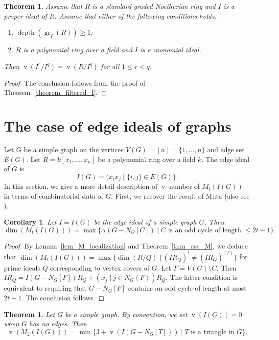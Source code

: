 \documentclass[12pt]{amsart}
\def\v{\operatorname{v}}
\def\max{\operatorname{max}}
\newtheorem{corollary}[lemma]{Corollary}
\newtheorem{theorem}[lemma]{Theorem}
\begin{document}
\begin{theorem} 
Assume that $R$ is a standard graded Noetherian ring and $I$ is a proper ideal of $R$. Assume that either of the following conditions holds:
\begin{enumerate}
    \item $\operatorname{depth}(\operatorname{gr}_I(R)) \ge 1$;
    \item $R$ is a polynomial ring over a field and $I$ is a monomial ideal.
\end{enumerate}
Then $\v(I^r / I^q) = \v(R / I^q)$ for all $1 \le r < q$.
\end{theorem}

\begin{proof}
The conclusion follows from the proof of Theorem~\ref{theorem_filtered_I}.
\end{proof}
\section{The case of edge ideals of graphs}\label{sec_edge}

Let $G$ be a simple graph on the vertices $V(G) = [n] = \{1,\ldots,n\}$ and edge set $E(G)$. Let $R = k [x_1,\ldots,x_n]$ be a polynomial ring over a field $k$. The edge ideal of $G$ is 
$$I(G) = (x_ix_j \mid \{i,j\} \in E(G)\}.$$
In this section, we give a more detail description of $\v$-number of $M_t(I(G))$ in terms of combinatorial data of $G$. First, we recover the result of Muta \cite[Corollary 4.10]{m26} (also see \cite{hm26}).

\begin{corollary} 
Let $I = I(G)$ be the edge ideal of a simple graph $G$. Then 
$$\dim(M_t(I(G))) = \max \{ \alpha(G - N_G[C]) \mid C \text{ is an odd cycle of length } \le 2t-1 \}.$$    
\end{corollary}

\begin{proof}
By Lemma~\ref{lem_M_localization} and Theorem~\ref{thm_ass_M}, we deduce that $\dim(M_t(I(G))) = \max \{ \dim(R/Q) \mid (I R_Q)^t \neq (I R_Q)^{(t)} \}$ for prime ideals $Q$ corresponding to vertex covers of $G$. Let $F = V(G) \setminus C$. Then $I R_Q = I(G - N_G[F]) R_Q + (x_j \mid j \in N_G(F)) R_Q$. The latter condition is equivalent to requiring that $G - N_G[F]$ contains an odd cycle of length at most $2t-1$. The conclusion follows.
\end{proof}

\begin{theorem}\label{thm_v_2}
Let $G$ be a simple graph. By convention, we set $\v(I(G)) = 0$ when $G$ has no edges. Then 
$$\v(M_2(I(G))) = \min \{ 3 + \v(I(G - N_G[T])) \mid T \text{ is a triangle in } G \}.$$
\end{theorem}
\end{document}
